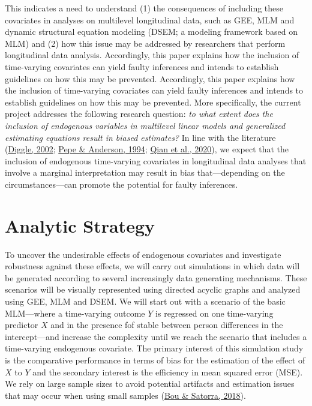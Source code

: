 \documentclass[
  12pt,
  a4paper,
]{article}
\begin{document}
This indicates a need to understand (1) the consequences of including
these covariates in analyses on multilevel longitudinal data, such as
GEE, MLM and dynamic structural equation modeling (DSEM; a modeling
framework based on MLM) and (2) how this issue may be addressed by
researchers that perform longitudinal data analysis. Accordingly, this
paper explains how the inclusion of time-varying covariates can yield
faulty inferences and intends to establish guidelines on how this may be
prevented. Accordingly, this paper explains how the inclusion of
time-varying covariates can yield faulty inferences and intends to
establish guidelines on how this may be prevented. More specifically,
the current project addresses the following research question: \emph{to
what extent does the inclusion of endogenous variables in multilevel
linear models and generalized estimating equations result in biased
estimates?} In line with the literature
(\protect\hyperlink{ref-diggle2002}{Diggle, 2002};
\protect\hyperlink{ref-pepe1994}{Pepe \& Anderson, 1994};
\protect\hyperlink{ref-qian2020}{Qian et al., 2020}), we expect that the
inclusion of endogenous time-varying covariates in longitudinal data
analyses that involve a marginal interpretation may result in bias
that---depending on the circumstances---can promote the potential for
faulty inferences.

\hypertarget{analytic-strategy}{%
\section{Analytic Strategy}\label{analytic-strategy}}

To uncover the undesirable effects of endogenous covariates and
investigate robustness against these effects, we will carry out
simulations in which data will be generated according to several
increasingly data generating mechanisms. These scenarios will be
visually represented using directed acyclic graphs and analyzed using
GEE, MLM and DSEM. We will start out with a scenario of the basic
MLM---where a time-varying outcome \(Y\) is regressed on one
time-varying predictor \(X\) and in the presence fof stable between
person differences in the intercept---and increase the complexity until
we reach the scenario that includes a time-varying endogenous covariate.
The primary interest of this simulation study is the comparative
performance in terms of bias for the estimation of the effect of \(X\)
to \(Y\) and the secondary interest is the efficiency in mean squared
error (MSE). We rely on large sample sizes to avoid potential artifacts
and estimation issues that may occur when using small samples
(\protect\hyperlink{ref-bou2018}{Bou \& Satorra, 2018}).
\end{document}
